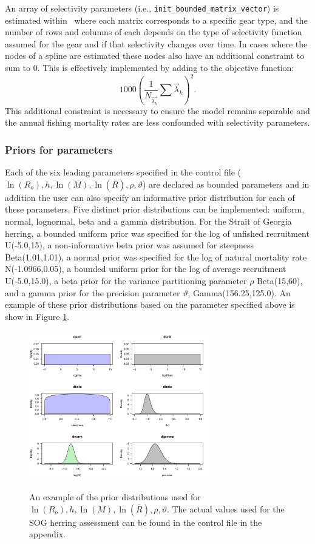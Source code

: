 An array of selectivity parameters (i.e., \verb"init_bounded_matrix_vector") is estimated within \iscam\, where each matrix corresponds to a specific gear type, and the number of rows and columns of each depends on the type of selectivity function assumed for the gear and if that selectivity changes over time.  In cases where the nodes of a spline are estimated these nodes also have an additional constraint to sum to 0.  This is effectively implemented by adding to the objective function: \[ 1000 \left(\frac{1}{N_{\vec{\lambda_k}}}\sum \vec{\lambda}_k \right)^2.\]  This additional constraint is necessary to ensure the model remains separable and the annual fishing mortality rates are less confounded with selectivity parameters.

\subsubsection{Priors for parameters}
	Each of the six leading parameters specified in the control file ($\ln(R_o),h,\ln(M),\ln(\bar{R}),\rho,\vartheta$) are declared as bounded parameters and in addition the user can also specify an informative prior distribution for each of these parameters.  Five distinct prior distributions can be implemented: uniform, normal, lognormal, beta and a gamma distribution.  For the Strait of Georgia herring, a bounded uniform prior was specified for  the log of unfished recruitment U(-5.0,15), a non-informative beta prior was assumed for steepness Beta(1.01,1.01), a normal prior was specified for the log of natural mortality rate N(-1.0966,0.05), a bounded uniform prior for the log of average recruitment U(-5.0,15.0), a beta prior for the variance partitioning parameter $\rho$ Beta(15,60), and a gamma prior for the precision parameter $\vartheta$, Gamma(156.25,125.0). An example of these prior distributions based on the parameter specified above is show in Figure \ref{FigPriorExample}. 
	
\begin{figure}[!tbp]
	\centering
	\includegraphics[width=0.7\textwidth]{Figs/priorexample.pdf}\\
	\caption{An example of the prior distributions used for $\ln(R_o),h,\ln(M),\ln(\bar{R}),\rho,\vartheta$.  The actual values used for the SOG herring assessment can be found in the control file in the appendix.}\label{FigPriorExample}
\end{figure}

